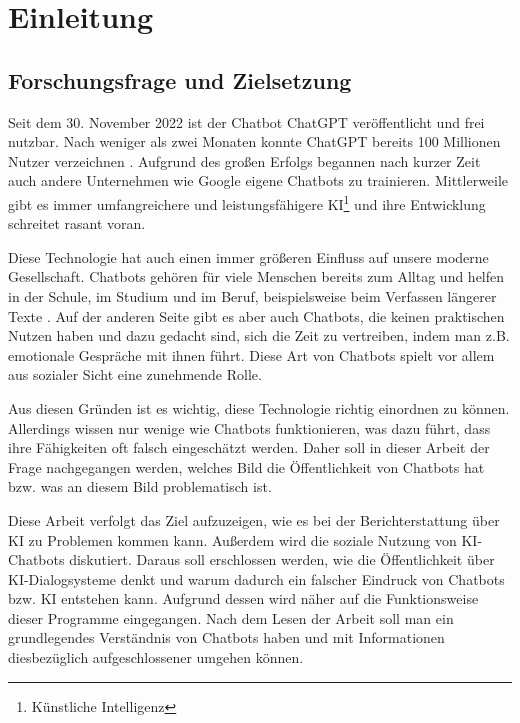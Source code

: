 \section{Einleitung}
	\subsection{Forschungsfrage und Zielsetzung}	 
	Seit dem 30. November 2022 ist der Chatbot ChatGPT veröffentlicht und frei nutzbar. 
	Nach weniger als zwei Monaten konnte ChatGPT bereits 100 Millionen Nutzer verzeichnen \cite[S. 15]{spitzer23}.
	Aufgrund des großen Erfolgs begannen nach kurzer Zeit auch andere Unternehmen wie Google eigene 
	Chatbots zu trainieren. Mittlerweile gibt es immer umfangreichere und leistungsfähigere KI\footnote{Künstliche Intelligenz} 
	und ihre Entwicklung schreitet rasant voran.	
	
	Diese Technologie hat auch einen immer größeren Einfluss auf unsere moderne Gesellschaft. 
	Chatbots gehören für viele Menschen bereits zum Alltag und helfen in der Schule, im Studium und im Beruf, 
	beispielsweise beim Verfassen längerer Texte \cite[S. 175, S. 185]{shaji23}.
	Auf der anderen Seite gibt es aber auch Chatbots, die keinen praktischen Nutzen haben und dazu gedacht sind,
	sich die Zeit zu vertreiben, indem man z.B. emotionale Gespräche mit ihnen führt. Diese Art von Chatbots spielt 
	vor allem aus sozialer Sicht eine zunehmende Rolle. 
	
	Aus diesen Gründen ist es wichtig, diese Technologie richtig einordnen zu können. Allerdings wissen nur wenige
	wie Chatbots funktionieren, was dazu führt, dass ihre Fähigkeiten oft falsch eingeschätzt werden. 
	Daher soll in dieser Arbeit der Frage nachgegangen werden, welches Bild die Öffentlichkeit von 
	Chatbots hat bzw. was an diesem Bild problematisch ist. 
	
	Diese Arbeit verfolgt das Ziel aufzuzeigen, wie es bei der Berichterstattung über KI zu Problemen
	kommen kann. Außerdem wird die soziale Nutzung von KI-Chatbots diskutiert. Daraus soll erschlossen 
	werden, wie die Öffentlichkeit über KI-Dialogsysteme denkt und warum dadurch ein falscher Eindruck von 
	Chatbots bzw. KI entstehen kann. Aufgrund dessen wird näher auf die Funktionsweise dieser Programme 
	eingegangen. Nach dem Lesen der Arbeit soll man ein grundlegendes Verständnis von Chatbots haben und 
	mit Informationen diesbezüglich aufgeschlossener umgehen können. 

	\clearpage
